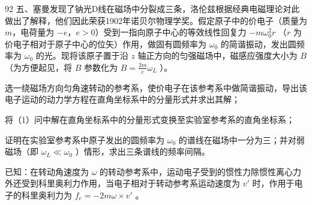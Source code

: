 \begin{problem}[第35届全国中学生物理竞赛复赛][塞曼效应与洛伦兹解释]{92}
五、塞曼发现了钠光D线在磁场中分裂成三条，洛伦兹根据经典电磁理论对此做出了解释，他们因此荣获1902年诺贝尔物理学奖。假定原子中的价电子（质量为 $m$，电荷量为 $-e$，$e>0$）受到一指向原子中心的等效线性回复力 $-m\omega_{0}^{2}r$ （$r$ 为价电子相对于原子中心的位矢）作用，做固有圆频率为 $\omega_{0}$ 的简谐振动，发出圆频率为 $\omega_{0}$ 的光。现将该原子置于沿 $z$ 轴正方向的匀强磁场中，磁感应强度大小为 $B$（为方便起见，将 $B$ 参数化为 $B=\frac{2m}{e}\omega_{L}$ ）。
\begin{subproblem}
选一绕磁场方向匀角速转动的参考系，使价电子在该参考系中做简谐振动，导出该电子运动的动力学方程在直角坐标系中的分量形式并求出其解；
\end{subproblem}
\begin{subproblem}
将（1）问中解在直角坐标系中的分量形式变换至实验室参考系的直角坐标系；
\end{subproblem}
\begin{subproblem}
证明在实验室参考系中原子发出的圆频率为 $\omega_{0}$ 的谱线在磁场中一分为三；并对弱磁场（即 $\omega_{L} \ll \omega_{0}$ ）情形，求出三条谱线的频率间隔。

已知：在转动角速度为 $\omega$ 的转动参考系中，运动电子受到的惯性力除惯性离心力外还受到科里奥利力作用，当电子相对于转动参考系运动速度为 $v'$ 时，作用于电子的科里奥利力为 $f_{c} = -2m\omega \times v'$ 。
\end{subproblem}
\end{problem}

